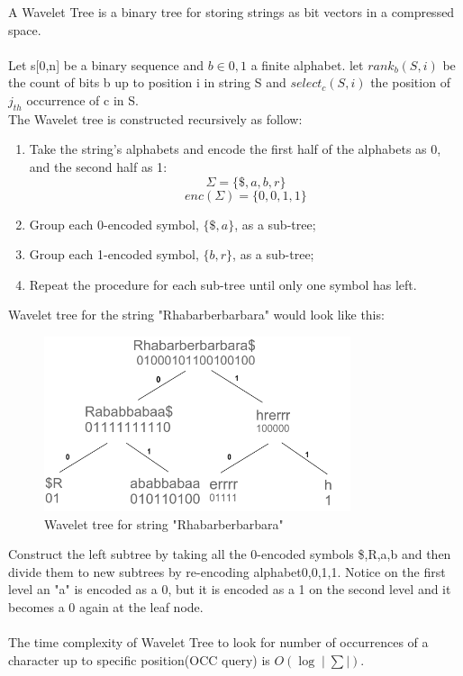 \documentclass[11pt,a4paper]{report}
\begin{document}
A Wavelet Tree is a binary tree for storing strings as bit vectors in a 
compressed space\cite{navarroWavelet}\cite{Wavthesis}\cite{AlexBowe}.\\\\
Let s[0,n] be a binary sequence and $b \in {0,1}$ a finite alphabet. 
let $ rank_{b}(S, i)$ be the count of bits b up to position i in string S 
and $ select_{c}(S,i)$  the position of $j_{th}$ occurrence of c in S.\\
The Wavelet tree is constructed recursively as follow:
\begin{enumerate}
    \item
		Take the string's alphabets and encode the first half of the 
		alphabets as 0, and the second half as 1\cite {AlexBowe}:
    		$$\Sigma = \{ \$, a, b, r \}$$
			$$enc(\Sigma) = \{ 0, 0, 1, 1 \}$$
    \item
		Group each 0-encoded symbol, $\{ \$, a \}$, as a sub-tree;
    \item
		Group each 1-encoded symbol, $\{ b , r\}$, as a sub-tree;
    \item
		Repeat the procedure for each sub-tree until only one symbol has left.
\end{enumerate}
Wavelet tree for the string "Rhabarberbarbara" would look like this:
\begin{figure}[H]
\centering
\includegraphics[width=9cm]{pictures/wavelet.png}
\caption{Wavelet tree for string "Rhabarberbarbara"}
\label{fig:barbWavlet}
\end{figure}

Construct the left subtree by taking all the 0-encoded symbols {\$,R,a,b} and
then divide them to new subtrees by re-encoding alphabet{0,0,1,1}.
Notice on the first level an "a" is encoded as a 0, but it is encoded as a 
1 on the second level and it becomes a 0 again at the leaf node.\\\\
The time complexity of Wavelet Tree to look for number of occurrences of a 
character up to specific position(OCC query) is $O(\log{}\mid\sum\mid)$.
\end{document}
